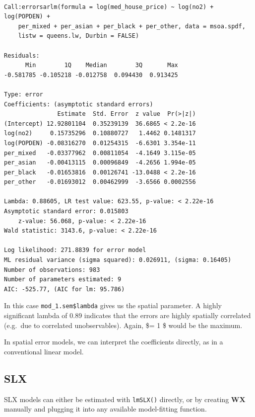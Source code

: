 \documentclass[
  letterpaper,
]{scrbook}
\begin{document}
\begin{verbatim}

Call:errorsarlm(formula = log(med_house_price) ~ log(no2) + log(POPDEN) + 
    per_mixed + per_asian + per_black + per_other, data = msoa.spdf, 
    listw = queens.lw, Durbin = FALSE)

Residuals:
      Min        1Q    Median        3Q       Max 
-0.581785 -0.105218 -0.012758  0.094430  0.913425 

Type: error 
Coefficients: (asymptotic standard errors) 
               Estimate  Std. Error  z value  Pr(>|z|)
(Intercept) 12.92801104  0.35239139  36.6865 < 2.2e-16
log(no2)     0.15735296  0.10880727   1.4462 0.1481317
log(POPDEN) -0.08316270  0.01254315  -6.6301 3.354e-11
per_mixed   -0.03377962  0.00811054  -4.1649 3.115e-05
per_asian   -0.00413115  0.00096849  -4.2656 1.994e-05
per_black   -0.01653816  0.00126741 -13.0488 < 2.2e-16
per_other   -0.01693012  0.00462999  -3.6566 0.0002556

Lambda: 0.88605, LR test value: 623.55, p-value: < 2.22e-16
Asymptotic standard error: 0.015803
    z-value: 56.068, p-value: < 2.22e-16
Wald statistic: 3143.6, p-value: < 2.22e-16

Log likelihood: 271.8839 for error model
ML residual variance (sigma squared): 0.026911, (sigma: 0.16405)
Number of observations: 983 
Number of parameters estimated: 9 
AIC: -525.77, (AIC for lm: 95.786)
\end{verbatim}

In this case \texttt{mod\_1.sem\$lambda} gives us the spatial parameter.
A highly significant lambda of 0.89 indicates that the errors are highly
spatially correlated (e.g.~due to correlated unobservables). Again,
\$\lambda = 1 \$ would be the maximum.

In spatial error models, we can interpret the coefficients directly, as
in a conventional linear model.

\hypertarget{slx}{%
\subsection{SLX}\label{slx}}

SLX models can either be estimated with \texttt{lmSLX()} directly, or by
creating \(\boldsymbol{\mathbf{W}} \boldsymbol{\mathbf{X}}\) manually
and plugging it into any available model-fitting function.
\end{document}
